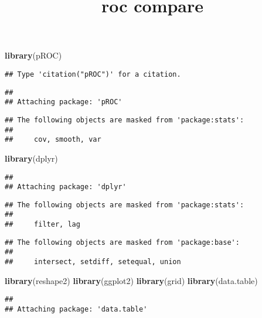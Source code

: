 \documentclass[]{article}
\title{roc compare}
\author{}
\date{}
\newenvironment{Shaded}{\begin{snugshade}}{\end{snugshade}}
\newcommand{\KeywordTok}[1]{\textcolor[rgb]{0.13,0.29,0.53}{\textbf{{#1}}}}
\newcommand{\NormalTok}[1]{{#1}}
\begin{document}
\maketitle

\begin{Shaded}
\begin{Highlighting}[]
\KeywordTok{library}\NormalTok{(pROC)}
\end{Highlighting}
\end{Shaded}

\begin{verbatim}
## Type 'citation("pROC")' for a citation.
\end{verbatim}

\begin{verbatim}
## 
## Attaching package: 'pROC'
\end{verbatim}

\begin{verbatim}
## The following objects are masked from 'package:stats':
## 
##     cov, smooth, var
\end{verbatim}

\begin{Shaded}
\begin{Highlighting}[]
\KeywordTok{library}\NormalTok{(dplyr)}
\end{Highlighting}
\end{Shaded}

\begin{verbatim}
## 
## Attaching package: 'dplyr'
\end{verbatim}

\begin{verbatim}
## The following objects are masked from 'package:stats':
## 
##     filter, lag
\end{verbatim}

\begin{verbatim}
## The following objects are masked from 'package:base':
## 
##     intersect, setdiff, setequal, union
\end{verbatim}

\begin{Shaded}
\begin{Highlighting}[]
\KeywordTok{library}\NormalTok{(reshape2)}
\KeywordTok{library}\NormalTok{(ggplot2)}
\KeywordTok{library}\NormalTok{(grid)}
\KeywordTok{library}\NormalTok{(data.table)}
\end{Highlighting}
\end{Shaded}

\begin{verbatim}
## 
## Attaching package: 'data.table'
\end{verbatim}
\end{document}
